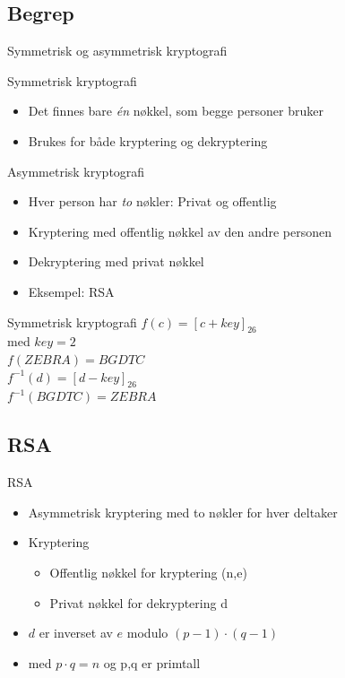 \subsection*{Begrep}
\begin{frame}{Symmetrisk og asymmetrisk kryptografi}
\begin{block}{Symmetrisk kryptografi}
\begin{itemize}
\item Det finnes bare \textit{én} nøkkel, som begge personer bruker
\item Brukes for både kryptering og dekryptering
\end{itemize}
\end{block}
\pause
\begin{block}{Asymmetrisk kryptografi}
\begin{itemize}
\item Hver person har \textit{to} nøkler: Privat og offentlig
\item Kryptering med offentlig nøkkel av den andre personen
\item Dekryptering med privat nøkkel
\item Eksempel: RSA
\end{itemize}
\end{block}
\end{frame}

\begin{frame}{Symmetrisk kryptografi}
    $f(c)=[c+key]_{26}$\\
    med $key=2$\\
    $f(ZEBRA)=BGDTC$\\
    
    $f^{-1}(d)=[d-key]_{26}$\\
    $f^{-1}(BGDTC)=ZEBRA$
\end{frame}

\subsection*{RSA}
\begin{frame}{RSA}
\begin{itemize}[<+->]
\item Asymmetrisk kryptering med to nøkler for hver deltaker
\item Kryptering
	\begin{itemize}
	\item Offentlig nøkkel for kryptering (n,e)
	\item Privat nøkkel for dekryptering d
	\end{itemize}
 \item $d$ er inverset av $e$ modulo $(p-1)\cdot (q-1)$ 
 \item med $p\cdot q=n$ og p,q er primtall
\end{itemize}
\end{frame}

